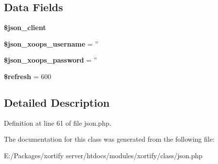 \subsection*{Data Fields}
\begin{DoxyCompactItemize}
\item 
\hypertarget{class_j_s_o_n_xortify_exchange_a2d091f9d959cab9ac28ad2cc96149447}{{\bfseries \$json\-\_\-client}}\label{class_j_s_o_n_xortify_exchange_a2d091f9d959cab9ac28ad2cc96149447}

\item 
\hypertarget{class_j_s_o_n_xortify_exchange_ac058687d82a56fb93513e7e58c4ec391}{{\bfseries \$json\-\_\-xoops\-\_\-username} = ''}\label{class_j_s_o_n_xortify_exchange_ac058687d82a56fb93513e7e58c4ec391}

\item 
\hypertarget{class_j_s_o_n_xortify_exchange_a7af311f07c1c09254920e6ac0cefe9a9}{{\bfseries \$json\-\_\-xoops\-\_\-password} = ''}\label{class_j_s_o_n_xortify_exchange_a7af311f07c1c09254920e6ac0cefe9a9}

\item 
\hypertarget{class_j_s_o_n_xortify_exchange_a8527f826b6959aaa92b0e51ee427ba1a}{{\bfseries \$refresh} = 600}\label{class_j_s_o_n_xortify_exchange_a8527f826b6959aaa92b0e51ee427ba1a}

\end{DoxyCompactItemize}


\subsection{Detailed Description}


Definition at line 61 of file json.\-php.



The documentation for this class was generated from the following file\-:\begin{DoxyCompactItemize}
\item 
E\-:/\-Packages/xortify server/htdocs/modules/xortify/class/json.\-php\end{DoxyCompactItemize}
